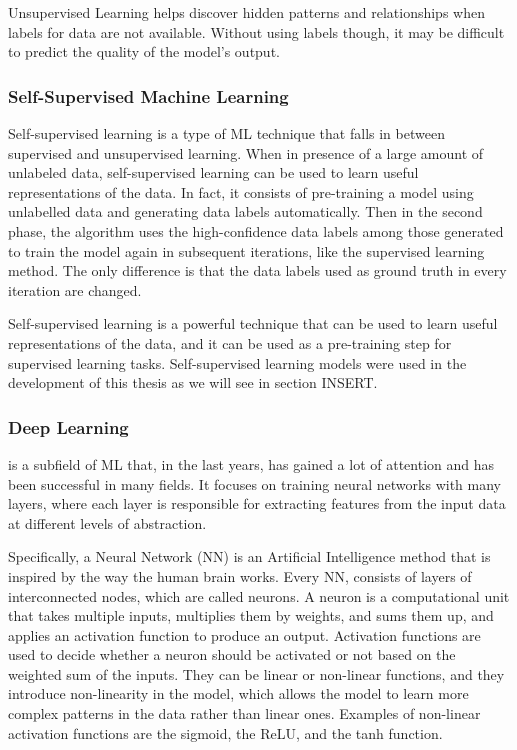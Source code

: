 Unsupervised Learning helps discover hidden patterns and relationships when labels for data are not available.
Without using labels though, it may be difficult to predict the quality of the model's output.





\subsubsection{Self-Supervised Machine Learning}
\label{sec:semisupervised_ml}
Self-supervised learning is a type of ML technique that falls in between supervised and unsupervised learning.
When in presence of a large amount of unlabeled data, self-supervised learning can be used to learn useful representations of the data.
In fact, it consists of pre-training a model using unlabelled data and generating data labels automatically. Then in the second phase, the algorithm uses the high-confidence data labels among those generated to train the model again in subsequent iterations, like the supervised learning method. The only difference is that the data labels used as ground truth in every iteration are changed.

Self-supervised learning is a powerful technique that can be used to learn useful representations of the data, and it can be used as a pre-training step for supervised learning tasks.
Self-supervised learning models were used in the development of this thesis as we will see in section INSERT.



\subsubsection{Deep Learning}
\label{sec:dl}
is a subfield of ML that, in the last years, has gained a lot of attention and has been successful in many fields.
It focuses on training neural networks with many layers, where each layer is responsible for extracting features from the input data at different levels of abstraction.

Specifically, a Neural Network (NN) is an Artificial Intelligence method that is inspired by the way the human brain works.
Every NN, consists of layers of interconnected nodes, which are called neurons.
A neuron is a computational unit that takes multiple inputs, multiplies them by weights, and sums them up, and applies an activation function to produce an output.
Activation functions are used to decide whether a neuron should be activated or not based on the weighted sum of the inputs.
They can be linear or non-linear functions, and they introduce non-linearity in the model, which allows the model to learn more complex patterns in the data rather than linear ones.
Examples of non-linear activation functions are the sigmoid, the ReLU, and the tanh function.

